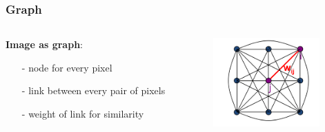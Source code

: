 \documentclass[notheorems,mathserif,table,compress]{beamer}  %
\begin{document}
\begin{frame}
    \frametitle{Graph}
    \begin{columns}
       \begin{column}[c]{0.5\textwidth}
          {\textbf{\Large Image as graph}}:\\
          \begin{itemize}
	  \item[-] {\color{blue} node} for every pixel
	  \item[-] {\color{blue} link} between every pair of pixels
	  \item[-] {\color{blue} weight} of link for similarity 
          \end{itemize}
      \end{column}
  
      \begin{column}[c]{0.5\textwidth}
          \begin{figure}[!ht]
          \centering
          \includegraphics[width=1.6in]{image.png}
          \end{figure}
     \end{column}
   \end{columns}
\end{frame}
\end{document}
